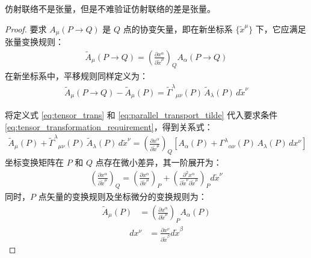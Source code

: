 仿射联络不是张量，但是不难验证仿射联络的差是张量。
\begin{proof}
要求 $A_\mu(P \to Q)$ 是 $Q$ 点的协变矢量，即在新坐标系 $\{\widetilde{x}^\mu\}$ 下，它应满足张量变换规则：
\begin{align}
\label{eq:tensor_transformation_requirement}
\widetilde{A}_{\mu}(P \rightarrow Q) = \left( \frac{\partial x^{\alpha}}{\partial \widetilde{x}^{\mu}} \right)_{Q} A_{\alpha}(P \rightarrow Q)
\end{align}
在新坐标系中，平移规则同样定义为：
\begin{align}
\widetilde{A}_{\mu}(P \rightarrow Q) - \widetilde{A}_{\mu}(P)
= \widetilde{\Gamma}^{\lambda}{}_{\mu\nu}(P)\, \widetilde{A}_{\lambda}(P)\, d\widetilde{x}^{\nu}
\label{eq:parallel_transport_tilde}
\end{align}

将定义式 \eqref{eq:tensor_trans} 和 \eqref{eq:parallel_transport_tilde} 代入要求条件 \eqref{eq:tensor_transformation_requirement}，得到关系式：
\begin{align}
\widetilde{A}_{\mu}(P) + \widetilde{\Gamma}^{\lambda}{}_{\mu\nu}(P)\,\widetilde{A}_{\lambda}(P)\, d\widetilde{x}^{\nu}
= \left( \frac{\partial x^{\alpha}}{\partial \widetilde{x}^{\mu}} \right)_{Q}
\left[ A_{\alpha}(P) + \Gamma^{\lambda}{}_{\alpha\nu}(P)\, A_{\lambda}(P)\, d x^{\nu} \right]
\label{eq:master_relation}
\end{align}
坐标变换矩阵在 $P$ 和 $Q$ 点存在微小差异，其一阶展开为：
\begin{align}
\left( \frac{\partial x^{\alpha}}{\partial \widetilde{x}^{\mu}} \right)_{Q}
= \left( \frac{\partial x^{\alpha}}{\partial \widetilde{x}^{\mu}} \right)_{P}
+ \left( \frac{\partial^{2} x^{\alpha}}{\partial \widetilde{x}^{\nu} \partial \widetilde{x}^{\mu}} \right)_{P} d \widetilde{x}^{\nu}
\label{eq:expansion_of_jacobian}
\end{align}
同时，$P$ 点矢量的变换规则及坐标微分的变换规则为：
\begin{align}
\widetilde{A}_\mu(P) &= \left( \frac{\partial x^{\alpha}}{\partial \widetilde{x}^{\mu}} \right)_P A_\alpha(P)
\label{eq:vec_trans}
\end{align}
\begin{align}
d x^{\nu} &= \frac{\partial x^{\nu}}{\partial \widetilde{x}^{\beta}} d\widetilde{x}^{\beta}
\label{eq:auxiliary_transformations}
\end{align}




\end{proof}
